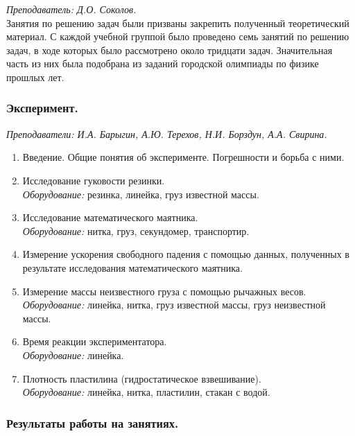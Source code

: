 \documentclass[12pt]{article}
\newlength{\h}
\newlength{\x}
\begin{document}
\textit{Преподаватель: Д.О. Соколов. }\\

Занятия по решению задач были призваны закрепить полученный
теоретический материал. С каждой учебной группой было проведено семь
занятий по решению задач, в ходе которых было рассмотрено около
тридцати задач. Значительная часть из них была подобрана из заданий
городской олимпиады по физике прошлых лет. 

\subsubsection{Эксперимент.}
\label{sec:daily8exp}

\textit{Преподаватели: И.А. Барыгин, А.Ю. Терехов, Н.И. Борздун, А.А. Свирина.}\\

\begin{enumerate}
\item Введение. Общие понятия об эксперименте. Погрешности и борьба с
  ними.
\item Исследование гуковости резинки. \\
  \textit{Оборудование:} резинка, линейка, груз известной массы.
\item Исследование математического маятника. \\
  \textit{Оборудование:} нитка, груз, секундомер, транспортир.
\item Измерение ускорения свободного падения с помощью данных,
  полученных в результате исследования математического маятника.
\item Измерение массы неизвестного груза с помощью рычажных весов. \\
  \textit{Оборудование:} линейка, нитка, груз известной массы,
  груз неизвестной массы. 
\item Время реакции экспериментатора. \\
  \textit{Оборудование:} линейка.
\item Плотность пластилина (гидростатическое взвешивание). \\
  \textit{Оборудование:} линейка, нитка, пластилин, стакан с водой. 
\end{enumerate}

\subsubsection{Результаты работы на занятиях. }
\label{sec:daily8res}
\end{document}
